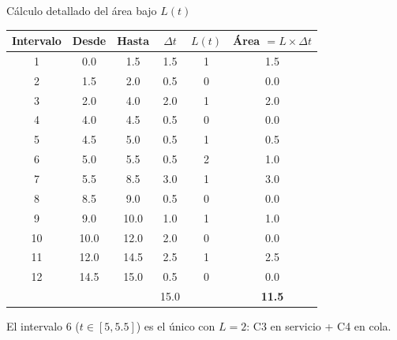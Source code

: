 \documentclass[aspectratio=1610, 9pt]{beamer}
\begin{document}
\begin{frame}{C\'{a}lculo detallado del \'{a}rea bajo $L(t)$}

\begin{center}
\small
\renewcommand{\arraystretch}{1.2}
\begin{tabular}{cccccc}
\toprule
\textbf{Intervalo} & \textbf{Desde} & \textbf{Hasta} & $\Delta t$ & $L(t)$ & \textbf{\'{A}rea} $= L \times \Delta t$ \\
\midrule
1 & 0.0 & 1.5 & 1.5 & 1 & \cellcolor{azul!10}1.5 \\
2 & 1.5 & 2.0 & 0.5 & 0 & 0.0 \\
3 & 2.0 & 4.0 & 2.0 & 1 & \cellcolor{azul!10}2.0 \\
4 & 4.0 & 4.5 & 0.5 & 0 & 0.0 \\
5 & 4.5 & 5.0 & 0.5 & 1 & \cellcolor{azul!10}0.5 \\
6 & 5.0 & 5.5 & 0.5 & \cellcolor{rojo!15}2 & \cellcolor{rojo!15}1.0 \\
7 & 5.5 & 8.5 & 3.0 & 1 & \cellcolor{azul!10}3.0 \\
8 & 8.5 & 9.0 & 0.5 & 0 & 0.0 \\
9 & 9.0 & 10.0 & 1.0 & 1 & \cellcolor{azul!10}1.0 \\
10 & 10.0 & 12.0 & 2.0 & 0 & 0.0 \\
11 & 12.0 & 14.5 & 2.5 & 1 & \cellcolor{azul!10}2.5 \\
12 & 14.5 & 15.0 & 0.5 & 0 & 0.0 \\
\midrule
& & & 15.0 & & \textbf{11.5} \\
\bottomrule
\end{tabular}
\end{center}

El intervalo 6 ($t \in [5, 5.5]$) es el \'{u}nico con $L=2$: C3 en servicio + C4 en cola.
\end{frame}
\end{document}
